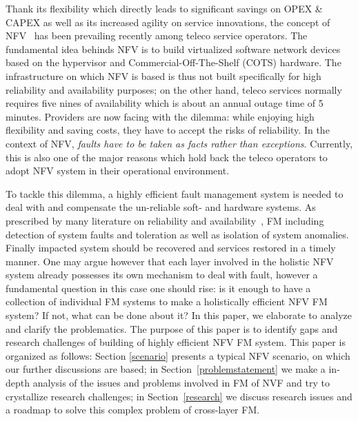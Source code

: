 \label{intro}
Thank its flexibility which directly leads to significant savings on OPEX \&
CAPEX as well as its increased agility on service innovations, the concept of
NFV~\cite{nfv} has been prevailing recently among teleco service operators. The
fundamental idea behinds NFV is to build virtualized software network devices
based on the hypervisor and Commercial-Off-The-Shelf (COTS) hardware. The
infrastructure on which NFV is based is thus not built specifically for high
reliability and availability purposes; on the other hand, teleco services normally
requires five nines of availability which is about an annual outage time of 5
minutes. Providers are now facing with the dilemma: while enjoying high
flexibility and saving costs, they have to accept the risks of reliability. In
the context of NFV, \textit{faults have to be taken as facts rather than
exceptions}. Currently, this is also one of the major reasons which hold back
the teleco operators to adopt NFV system in their operational environment.

To tackle this dilemma, a highly efficient fault management system is needed to
deal with and compensate the un-reliable soft- and hardware systems.  As
prescribed by many literature on reliability and availability~\cite{depdef}, FM
including detection of system faults and toleration as well as isolation of
system anomalies. Finally impacted system should be recovered and services
restored in a timely manner. One may argue however that each layer involved in
the holistic NFV system already possesses its own mechanism to deal with fault,
however a fundamental question in this case one should rise: is it enough to
have a collection of individual FM systems to make a holistically efficient NFV
FM system? If not, what can be done about it? In this paper, we elaborate to
analyze and clarify the problematics.  The purpose of this paper is to identify
gaps and research challenges of building of highly efficient NFV FM system. This
paper is organized as follows: Section \ref{scenario} presents a typical NFV
scenario, on which our further discussions are based; in
Section~\ref{problemstatement} we make a in-depth analysis of the issues and
problems involved in FM of NVF and try to crystallize research challenges; in
Section~\ref{research} we discuss research issues and a roadmap to solve this
complex problem of cross-layer FM.  
